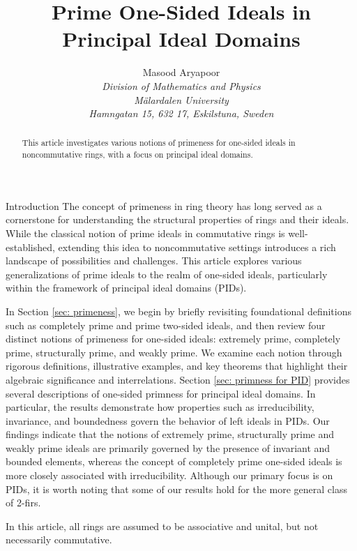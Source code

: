 \documentclass[11pt,a4paper]{article}
\title{Prime One-Sided Ideals in Principal Ideal Domains}
\author{Masood Aryapoor\\
	\tiny{\textit{Division of Mathematics and Physics}}\\
	\tiny{\textit{M\"{a}lardalen  University}}\\
	\tiny{\textit{Hamngatan 15, 632 17, Eskilstuna, 
			Sweden
	}}
}
\date{}
\theoremstyle{theorem}
\numberwithin{equation}{section}
\begin{document}
 \maketitle
\begin{abstract}
This article investigates various notions of primeness for one-sided ideals in noncommutative rings, with a focus on principal ideal domains. 

\end{abstract}
\begin{section}{Introduction} 
 The concept of primeness in ring theory has long served as a cornerstone for understanding the structural properties of rings and their ideals. While the classical notion of prime ideals in commutative rings is well-established, extending  this idea to noncommutative settings introduces a rich landscape of possibilities and challenges. 
 This article explores various generalizations of prime ideals to the realm of one-sided ideals, particularly within the framework of principal ideal domains (PIDs).
 
 In Section \ref{sec: primeness}, we begin by briefly revisiting foundational definitions such as completely prime and prime two-sided ideals, and then review four distinct notions of primeness for one-sided ideals: extremely prime, completely prime, structurally prime, and weakly prime. We examine each notion through rigorous definitions, illustrative examples, and key theorems that highlight their algebraic significance and interrelations. Section \ref{sec: primness for PID} provides several descriptions of one-sided primness for principal ideal domains. In particular, the results demonstrate how properties such as irreducibility,
 invariance, and boundedness govern the behavior of left ideals in PIDs. Our findings indicate that the notions of extremely prime, structurally prime and weakly prime ideals are primarily governed by the presence of invariant and bounded elements, whereas the concept of completely prime one-sided ideals is more closely associated with irreducibility. Although our primary focus is on PIDs, it is worth noting that some of our results hold for the more general class of 2-firs. 
 
In this article, all rings are assumed to be associative and unital, but not necessarily commutative. 



\end{section}
\end{document}
